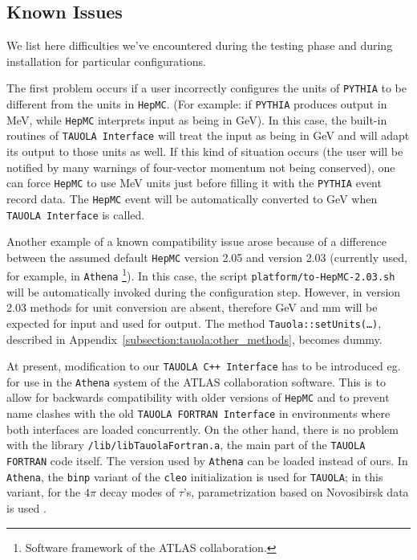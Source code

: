 \documentclass[]{Tauola_interface_design}
\begin{document}
\subsection{ Known Issues}
\label{subs:Issues}

We list  here difficulties  we've encountered during the testing phase and during 
installation for particular configurations.

The first problem occurs if a user incorrectly configures the units of
{\tt PYTHIA} to be different from the units in {\tt HepMC}. (For
example: if {\tt PYTHIA} produces output in MeV, while {\tt HepMC}
interprets input as being in GeV).  In this case, the
built-in routines of {\tt TAUOLA Interface} will treat the input as being in
GeV and will adapt its output to those units as well.  If this kind of
situation occurs (the user will be notified by many warnings of
four-vector momentum not being conserved), one can force {\tt HepMC}
to use MeV units just before filling it with the {\tt PYTHIA} event record
data. The {\tt HepMC} event will be automatically converted to GeV
when {\tt TAUOLA Interface} is called.

Another example of a known  compatibility issue arose because of a difference between the assumed default 
   {\tt HepMC} version 2.05 and  version 2.03 (currently used, for example, in {\tt Athena}%
\footnote{Software framework   of the ATLAS collaboration.}). 
In this case, the script  {\tt platform/to-HepMC-2.03.sh} will be automatically invoked during the configuration
step.
However, in version 2.03 methods for unit conversion
are absent,  therefore GeV and mm will be expected for input and used for output. The method
  {\tt Tauola::setUnits(\dots)},
described in Appendix~\ref{subsection:tauola:other_methods}, becomes dummy.



At present, modification to our {\tt TAUOLA C++ Interface}  has to be introduced
eg.  for use
in the {\tt Athena} system
of the ATLAS collaboration software.  This is to allow for backwards compatibility with 
older versions of
{\tt HepMC}  and to prevent name clashes with the old {\tt TAUOLA FORTRAN
Interface} in environments where both interfaces are loaded concurrently.
 On the other 
hand, there is no problem with the library {\tt /lib/libTauolaFortran.a}, the 
main part of the {\tt TAUOLA FORTRAN} code itself. The version used by {\tt Athena} can be loaded 
instead of ours. In 
{\tt Athena}, the {\tt binp} variant of the {\tt cleo} initialization is used for
{\tt TAUOLA}; in this variant, 
 for the $4\pi$  decay modes of $\tau$'s, parametrization based 
on Novosibirsk data 
is used \cite{Bondar:2002mw}. 
\end{document}
